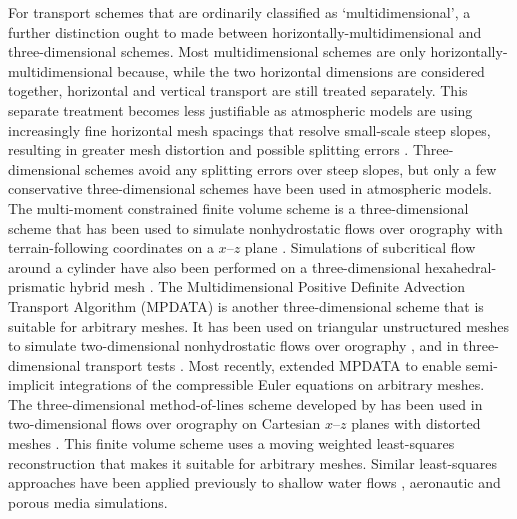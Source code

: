 For transport schemes that are ordinarily classified as `multidimensional', a further distinction ought to made between horizontally-multidimensional and three-dimensional schemes.
Most multidimensional schemes are only horizontally-multidimensional because, while the two horizontal dimensions are considered together, horizontal and vertical transport are still treated separately.
This separate treatment becomes less justifiable as atmospheric models are using increasingly fine horizontal mesh spacings that resolve small-scale steep slopes, resulting in greater mesh distortion and possible splitting errors \citep{kent2014}.
Three-dimensional schemes avoid any splitting errors over steep slopes, but only a few conservative three-dimensional schemes have been used in atmospheric models.
The multi-moment constrained finite volume scheme \citep{ii-xiao2009} is a three-dimensional scheme that has been used to simulate nonhydrostatic flows over orography with terrain-following coordinates on a $x$--$z$ plane \citep{li2013}.  Simulations of subcritical flow around a cylinder have also been performed on a three-dimensional hexahedral-prismatic hybrid mesh \citep{xie-xiao2016}.
The Multidimensional Positive Definite Advection Transport Algorithm (MPDATA) is another three-dimensional scheme that is suitable for arbitrary meshes.
It has been used on triangular unstructured meshes to simulate two-dimensional nonhydrostatic flows over orography \citep{smolarkiewicz-szmelter2011}, and in three-dimensional transport tests \citep{smolarkiewicz-szmelter2005}. 
Most recently, \citet{kuehnlein-smolarkiewicz2017} extended MPDATA to enable semi-implicit integrations of the compressible Euler equations on arbitrary meshes.
The three-dimensional method-of-lines scheme developed by \citet{weller-shahrokhi2014} has been used in two-dimensional flows over orography on Cartesian $x$--$z$ planes with distorted meshes \citep{chen2017}.
This finite volume scheme uses a moving weighted least-squares reconstruction \citep{lashley2002,thuburn2014} that makes it suitable for arbitrary meshes.
Similar least-squares approaches have been applied previously to shallow water flows \citep{cuetofelgueroso2006}, aeronautic \citep{cuetofelgueroso2007} and porous media \citep{white2017} simulations.

